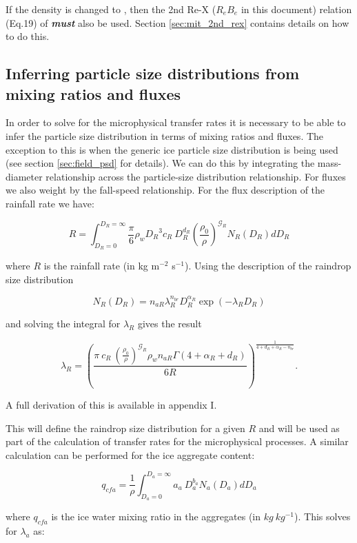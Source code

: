 \documentclass{UMDP_article}
\def\bq{\begin{equation}}
\def\eq{\end{equation}}
\begin{document}
If the density is changed to \cite{Brown:Francis:1995}, then the 2nd Re-X 
($R_e$\-$B_e$ in this document) relation (Eq.19) of \cite{Mitchell:1996}
 \textit{\textbf{must}} also be used. Section
\ref{sec:mit_2nd_rex} contains details on how to do this. 

\subsection{Inferring particle size distributions from mixing ratios and fluxes}
\label{mr2psd}

In order to solve for the microphysical transfer rates it is necessary to
be able to infer the particle size distribution in terms of mixing ratios
and fluxes. The exception to this is when the generic ice particle size 
distribution is being used (see section \ref{sec:field_psd} for details).
We can do this by integrating the mass-diameter relationship across
the particle-size distribution relationship. For fluxes we also weight by the
fall-speed relationship. For the flux description of the rainfall rate we have:

\bq
R = \int_{D_R = 0}^{D_R = \infty} \frac{\pi}{6} 
\rho_w {D_R}^3 c_R ~ D_R^{d_R} \left(\frac{\rho_0}{\rho}\right)^{\mathcal{G}_R}  
N_R(D_R) dD_R
\eq

where $R$ is the rainfall rate (in kg m$^{-2}$ s$^{-1}$). 
Using the description of the raindrop size distribution

\bq
N_R (D_R) = n_{aR} \lambda_R ^{n_{br}}  D_R ^{\alpha_R} \exp 
\left( - \lambda_R D_R \right)
\eq

and solving the integral for $\lambda_R$ gives the result

\bq
\lambda_R = { \left( \frac { \pi ~c_R~ { \left( \frac{\rho_0}{\rho} \right) }
^{\mathcal{G}_R} \rho_w n_{aR} \Gamma \left( 4 + \alpha_R +d_R \right) } 
{6 R} \right) } ^ { \frac{1}{4 + d_R + \alpha_R - n_{br}} } .
\eq

A full derivation of this is available in appendix I.

This will define the raindrop size distribution for a given $R$ and will be 
used as part of the calculation of transfer rates for the microphysical 
processes. A similar calculation can be performed for the ice aggregate content:

\bq
q_{cfa} = \frac{1}{\rho} \int_{D_a = 0}^{D_a = \infty} a_a~D_a^{b_a} N_a(D_a) dD_a
\eq

where $q_{cfa}$ is the ice water mixing ratio in the aggregates 
(in $kg~kg^{-1}$). This solves for $\lambda_a$ as:
\end{document}
